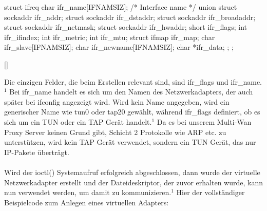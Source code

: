 \begin{program}[H]
    \begin{CppCode}
struct ifreq {
    char ifr_name[IFNAMSIZ]; /* Interface name */
    union {
        struct sockaddr ifr_addr;
        struct sockaddr ifr_dstaddr;
        struct sockaddr ifr_broadaddr;
        struct sockaddr ifr_netmask;
        struct sockaddr ifr_hwaddr;
        short           ifr_flags;
        int             ifr_ifindex;
        int             ifr_metric;
        int             ifr_mtu;
        struct ifmap    ifr_map;
        char            ifr_slave[IFNAMSIZ];
        char            ifr_newname[IFNAMSIZ];
        char           *ifr_data;
    };
};
    \end{CppCode}[\cite{SRV10}]
\end{program}
\noindent
Die einzigen Felder, die beim Erstellen relevant sind, sind ifr\_flags und ifr\_name.$^{1}$ Bei ifr\_name handelt es sich um den Namen des Netzwerkadapters, der auch später bei ifconfig angezeigt wird. Wird kein Name angegeben, wird ein generischer Name wie tun0 oder tap20 gewählt, während ifr\_flags definiert, ob es sich um ein TUN oder ein TAP Gerät handelt.$^{1}$ Da es bei unserem Multi-Wan Proxy Server keinen Grund gibt, Schicht 2 Protokolle wie ARP etc. zu unterstützen, wird kein TAP Gerät verwendet, sondern ein TUN Gerät, das nur IP-Pakete überträgt. 
\\\\ 
Wird der ioctl() Systemaufruf erfolgreich abgeschlossen, dann wurde der virtuelle Netzwerkadapter erstellt und der Dateideskriptor, der zuvor erhalten wurde, kann nun verwendet werden, um damit zu kommunizieren.$^{1}$ Hier der vollständiger Beispielcode zum Anlegen eines virtuellen Adapters:
